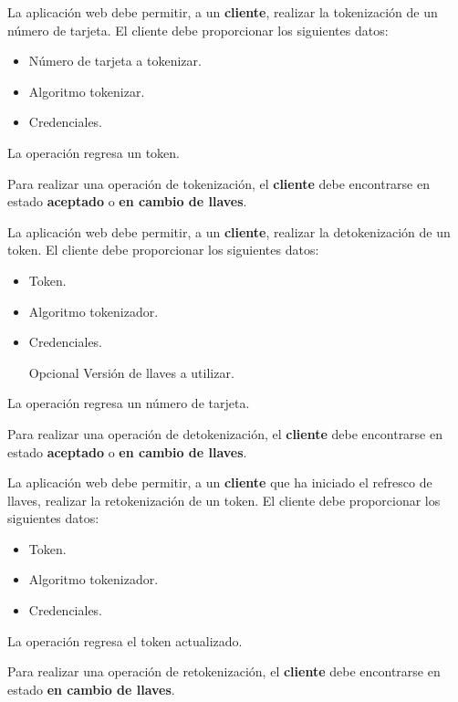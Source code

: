 {
  La aplicación web debe permitir, a un \textbf{cliente}, realizar la
  tokenización de un número de tarjeta. El cliente debe proporcionar los
  siguientes datos:
  \begin{itemize}
    \item Número de tarjeta a tokenizar.
    \item Algoritmo tokenizar.
    \item Credenciales.
  \end{itemize}
  La operación regresa un token.

  {
    Para realizar una operación de tokenización, el \textbf{cliente} debe
    encontrarse en estado \textbf{aceptado} o \textbf{en cambio de llaves}.
  }
}

{
  La aplicación web debe permitir, a un \textbf{cliente}, realizar la
  detokenización de un token. El cliente debe proporcionar los siguientes datos:
  \begin{itemize}
    \item Token.
    \item Algoritmo tokenizador.
    \item Credenciales.
    \item [Opcional] Versión de llaves a utilizar.
  \end{itemize}
  La operación regresa un número de tarjeta.

  {
    Para realizar una operación de detokenización, el \textbf{cliente} debe
    encontrarse en estado \textbf{aceptado} o \textbf{en cambio de llaves}.
  }
}

{
  La aplicación web debe permitir, a un \textbf{cliente} que ha iniciado el
  refresco de llaves, realizar la retokenización de un token. El cliente debe
  proporcionar los siguientes datos:
  \begin{itemize}
    \item Token.
    \item Algoritmo tokenizador.
    \item Credenciales.
  \end{itemize}
  La operación regresa el token actualizado.

  {
    Para realizar una operación de retokenización, el \textbf{cliente} debe
    encontrarse en estado \textbf{en cambio de llaves}.
  }
}

